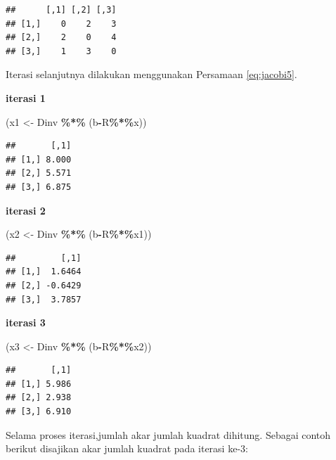 \documentclass[
]{book}
\newenvironment{Shaded}{\begin{snugshade}}{\end{snugshade}}
\newcommand{\NormalTok}[1]{#1}
\newcommand{\OtherTok}[1]{\textcolor[rgb]{0.56,0.35,0.01}{#1}}
\newcommand{\SpecialCharTok}[1]{\textcolor[rgb]{0.81,0.36,0.00}{\textbf{#1}}}
\theoremstyle{definition}
\theoremstyle{definition}
\theoremstyle{definition}
\theoremstyle{definition}
\theoremstyle{remark}
\begin{document}
\begin{verbatim}
##      [,1] [,2] [,3]
## [1,]    0    2    3
## [2,]    2    0    4
## [3,]    1    3    0
\end{verbatim}

Iterasi selanjutnya dilakukan menggunakan Persamaan \eqref{eq:jacobi5}.

\textbf{iterasi 1}

\begin{Shaded}
\begin{Highlighting}[]
\NormalTok{(x1 }\OtherTok{\textless{}{-}}\NormalTok{ Dinv }\SpecialCharTok{\%*\%}\NormalTok{ (b}\SpecialCharTok{{-}}\NormalTok{R}\SpecialCharTok{\%*\%}\NormalTok{x))}
\end{Highlighting}
\end{Shaded}

\begin{verbatim}
##       [,1]
## [1,] 8.000
## [2,] 5.571
## [3,] 6.875
\end{verbatim}

\textbf{iterasi 2}

\begin{Shaded}
\begin{Highlighting}[]
\NormalTok{(x2 }\OtherTok{\textless{}{-}}\NormalTok{ Dinv }\SpecialCharTok{\%*\%}\NormalTok{ (b}\SpecialCharTok{{-}}\NormalTok{R}\SpecialCharTok{\%*\%}\NormalTok{x1))}
\end{Highlighting}
\end{Shaded}

\begin{verbatim}
##         [,1]
## [1,]  1.6464
## [2,] -0.6429
## [3,]  3.7857
\end{verbatim}

\textbf{iterasi 3}

\begin{Shaded}
\begin{Highlighting}[]
\NormalTok{(x3 }\OtherTok{\textless{}{-}}\NormalTok{ Dinv }\SpecialCharTok{\%*\%}\NormalTok{ (b}\SpecialCharTok{{-}}\NormalTok{R}\SpecialCharTok{\%*\%}\NormalTok{x2))}
\end{Highlighting}
\end{Shaded}

\begin{verbatim}
##       [,1]
## [1,] 5.986
## [2,] 2.938
## [3,] 6.910
\end{verbatim}

Selama proses iterasi,jumlah akar jumlah kuadrat dihitung. Sebagai contoh berikut disajikan akar jumlah kuadrat pada iterasi ke-3:
\end{document}
